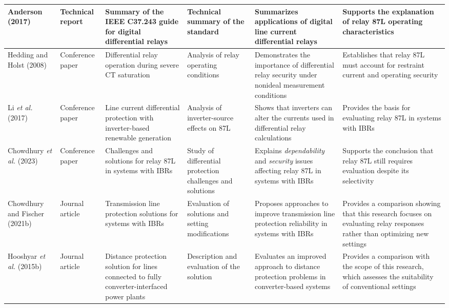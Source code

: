 \begin{longtable}{|p{}|p{}|p{}|p{}|p{}|p{}|}
    Anderson (2017) \cite{anderson2017summary} & Technical report & Summary of the IEEE C37.243 guide for digital differential relays & Technical summary of the standard & Summarizes applications of digital line current differential relays & Supports the explanation of relay 87L operating characteristics \\ \hline

    Hedding and Holst (2008) \cite{hedding2008line} & Conference paper & Differential relay operation during severe CT saturation & Analysis of relay operating conditions & Demonstrates the importance of differential relay security under nonideal measurement conditions & Establishes that relay 87L must account for restraint current and operating security \\ \hline

    Li \textit{et al.} (2017) \cite{li2017analysis} & Conference paper & Line current differential protection with inverter-based renewable generation & Analysis of inverter-source effects on 87L & Shows that inverters can alter the currents used in differential relay calculations & Provides the basis for evaluating relay 87L in systems with IBRs \\ \hline

    Chowdhury \textit{et al.} (2023) \cite{chowdhury2023lcd} & Conference paper & Challenges and solutions for relay 87L in systems with IBRs & Study of differential protection challenges and solutions & Explains \textit{dependability} and \textit{security} issues affecting relay 87L in systems with IBRs & Supports the conclusion that relay 87L still requires evaluation despite its selectivity \\ \hline

    Chowdhury and Fischer (2021b) \cite{chowdhury2021tlp2} & Journal article & Transmission line protection solutions for systems with IBRs & Evaluation of solutions and setting modifications & Proposes approaches to improve transmission line protection reliability in systems with IBRs & Provides a comparison showing that this research focuses on evaluating relay responses rather than optimizing new settings \\ \hline

    Hooshyar \textit{et al.} (2015b) \cite{hooshyar2015distance_part2} & Journal article & Distance protection solution for lines connected to fully converter-interfaced power plants & Description and evaluation of the solution & Evaluates an improved approach to distance protection problems in converter-based systems & Provides a comparison with the scope of this research, which assesses the suitability of conventional settings \\ \hline
\end{longtable}
\endgroup

